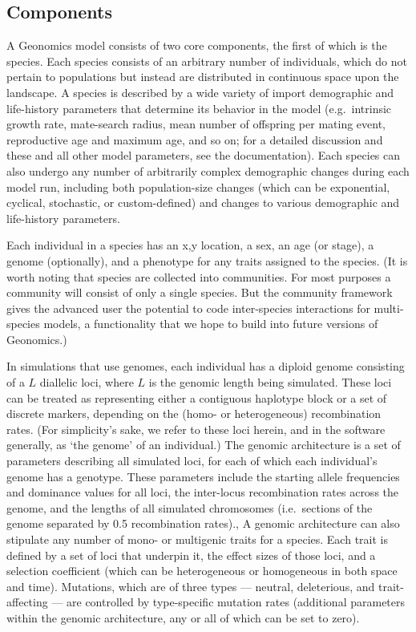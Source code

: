 ﻿\documentclass{article}
\begin{document}
\subsection{Components}
A Geonomics model consists of two core components, the first of which is the species.
Each species consists of an arbitrary number of individuals, which do not pertain to
populations but instead are distributed in continuous space upon the landscape.
A species is described by a wide variety of import demographic and life-history parameters
that determine its behavior in the model (e.g.\ intrinsic growth rate, mate-search radius,
mean number of offspring per mating event, reproductive age and maximum age, and so on;
for a detailed discussion and these and all other model parameters, see the documentation).
Each species can also undergo any number of arbitrarily complex demographic changes during
each model run, including both population-size changes
(which can be exponential, cyclical, stochastic, or custom-defined)
and changes to various demographic and life-history parameters.

Each individual in a species has an x,y location, a sex, an age (or stage),
a genome (optionally), and a phenotype for any traits assigned to the species.
(It is worth noting that species are collected into communities.
For most purposes a community will consist of
only a single species. But the community framework gives the advanced user the potential
to code inter-species interactions for multi-species models, a functionality that we hope
to build into future versions of Geonomics.)

In simulations that use genomes, each individual has a diploid genome consisting
of a $L$ diallelic loci, where $L$ is the genomic length being simulated.
These loci can be treated as representing either a contiguous haplotype block
or a set of discrete markers, depending on the (homo- or heterogeneous) recombination rates.
(For simplicity's sake, we refer to these loci herein, and in the software generally, as `the genome' of an individual.)
The genomic architecture is a set of parameters describing all simulated loci,
for each of which each individual's genome has a genotype.
These parameters include the starting allele frequencies and dominance values for all loci,
the inter-locus recombination rates across the genome, and the lengths of all simulated chromosomes
(i.e.\ sections of the genome separated by 0.5 recombination rates)., 
A genomic architecture can also stipulate any number of mono- or multigenic traits for a species.
Each trait is defined by a set of loci that underpin it, the effect sizes of those loci,
and a selection coefficient (which can be heterogeneous or homogeneous in both space and time).
Mutations, which are of three types --- neutral, deleterious, and trait-affecting --- are controlled by
type-specific mutation rates (additional parameters within the genomic architecture, any or all of which can be set to zero).
\end{document}
